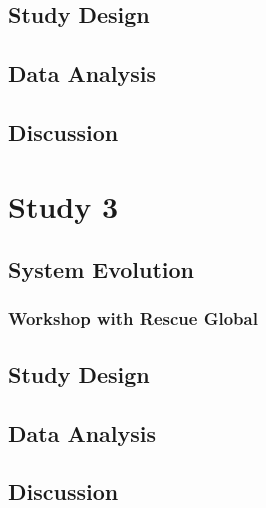\section{Study Design}

\section{Data Analysis}

\section{Discussion}


\chapter{Study 3}\label{ch:mathtest} %

\section{System Evolution}

\subsection{Workshop with Rescue Global}

\section{Study Design}

\section{Data Analysis}

\section{Discussion}




